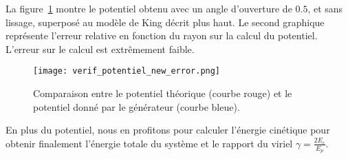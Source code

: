 			La figure~\ref{potentiel_5000} montre le potentiel obtenu avec un angle d'ouverture de $0.5$, et sans lissage, superposé au
			modèle de King décrit plus haut. Le second graphique représente l'erreur relative en fonction du rayon sur la calcul du
			potentiel. L'erreur sur le calcul est extrêmement faible.
			\begin{figure}[htbp]
				\centering \texttt{[image: verif\_potentiel\_new\_error.png]}
				\caption{Comparaison entre le potentiel théorique (courbe rouge) et le potentiel donné par le
					générateur (courbe bleue)\label{potentiel_5000}.}
			\end{figure}

			En plus du potentiel, nous en profitons pour calculer l'énergie cinétique pour obtenir finalement
			l'énergie totale du système et le rapport du viriel $\gamma = \frac{2E_c}{E_p}$.



